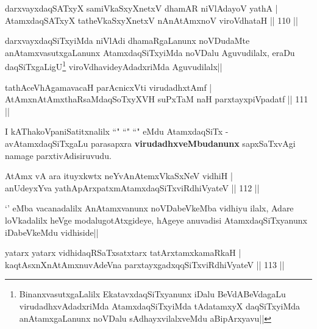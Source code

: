 \begin{shl}
darxvayxdaqSATxyX samiVkaSxyXnetxV dhamAR niVlAdayoV yathA |\\
AtamxdaqSATxyX tatheVkaSxyXnetxV nAnAtAmxnoV viroVdhataH \hfill || 110 ||
\end{shl}

\begin{artha}
darxvayxdaqSiTxyiMda niVlAdi dhamaRgaLanunx noVDudaMte anAtamxvasutxgaLanunx AtamxdaqSiTxyiMda noVDalu Aguvudilalx, eraDu daqSiTxgaLigU\footnote{BinanxvasutxgaLalilx EkatavxdaqSiTxyanunx iDalu BeVdABeVdagaLu virudadhxvAdadxriMda AtamxdaqSiTxyiMda tAdatamxyX daqSiTxyiMda anAtamxgaLanunx noVDalu sAdhayxvilalxveMdu aBipArxyavu||} viroVdhavideyAdadxriMda Aguvudilalx||
\end{artha}


\begin{shl}
tathAceVhA\s \s gamavacaH parAcnicxVti virudadhxtAmf |\\
AtAmxnAtAmxthaRsaMdaqSoTxyXVH suPxTaM naH parxtayxpiVpadatf \hfill || 111 ||
\end{shl}

\begin{artha}
I kAThakoVpaniSatitxnalilx ``\stext" ``\stext" ``\stext" eMdu AtamxdaqSiTx - avAtamxdaqSiTxgaLu parasapxra \textbf{virudadhxveMbudanunx} sapxSaTxvAgi namage parxtivAdisiruvudu.
\end{artha}


\begin{shl}
AtAmx vA ara ituyxkwtx neYvAnAtemxVkaSxNeV vidhiH |\\
anUdeyxYva yathApArxpatxmAtamxdaqSiTxviRdhiVyateV \hfill || 112 ||
\end{shl}

`\stext' eMba vacanadalilx AnAtamxvanunx noVDabeVkeMba vidhiyu ilalx, Adare loVkadalilx heVge modalugotAtxgideye, hAgeye anuvadisi AtamxdaqSiTxyanunx iDabeVkeMdu vidhiside||


\begin{shl}
yatarx yatarx vidhidaqRSaTxsatxtarx tatArx\s \s tamxkamaRkaH |\\
kaqtAsxnXnAtAmxnuvAdeVna parxtayxgadxqqSiTxviRdhiVyateV \hfill || 113 ||
\end{shl}

